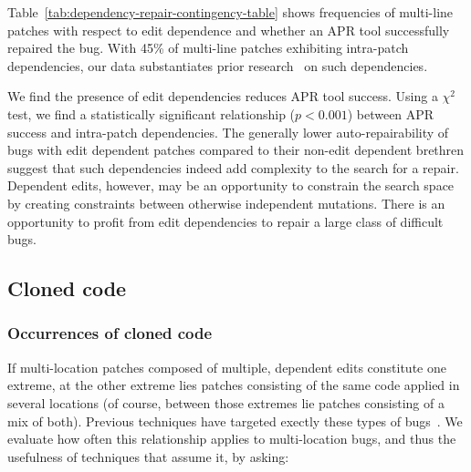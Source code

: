\documentclass[10pt, conference]{IEEEtran}
\begin{document}
Table~\ref{tab:dependency-repair-contingency-table}
shows frequencies of multi-line patches with respect to edit dependence 
and whether an APR tool successfully repaired the bug.
With 45\% of multi-line patches exhibiting intra-patch dependencies, 
our data substantiates prior research~\cite{zhong2015} on 
such dependencies.


We find the presence of edit dependencies 
reduces APR tool success.
Using a $\chi^2$ test, we find a statistically significant relationship ($p < 0.001$)
between APR success and intra-patch dependencies.
The generally lower auto-repairability of bugs with edit dependent patches compared 
to their non-edit dependent brethren suggest that such dependencies indeed 
add complexity to the search for a repair.
Dependent edits, however, may 
be an opportunity to constrain the search space by creating constraints between 
otherwise independent mutations. There is an opportunity to profit from edit 
dependencies to repair a large class of difficult bugs.


\subsection{Cloned code}

\subsubsection{Occurrences of cloned code}

If multi-location patches composed of multiple, dependent edits constitute one
extreme, at the other extreme lies patches consisting of the same code applied
in several locations (of course, between those extremes lie patches consisting
of a mix of both). Previous techniques have targeted exectly these types of
bugs~\cite{wang2018,saha2019harnessing}.  We evaluate how often this relationship applies to
multi-location bugs, and thus the usefulness of techniques that assume it, by asking: 


\end{document}

